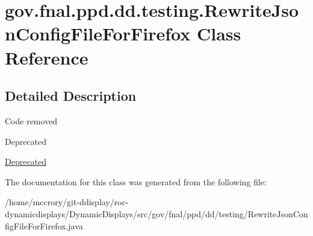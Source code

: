 \hypertarget{classgov_1_1fnal_1_1ppd_1_1dd_1_1testing_1_1RewriteJsonConfigFileForFirefox}{\section{gov.\-fnal.\-ppd.\-dd.\-testing.\-Rewrite\-Json\-Config\-File\-For\-Firefox Class Reference}
\label{classgov_1_1fnal_1_1ppd_1_1dd_1_1testing_1_1RewriteJsonConfigFileForFirefox}
}


\subsection{Detailed Description}
Code removed \begin{DoxyRefDesc}{Deprecated}
\item[\hyperlink{deprecated__deprecated000009}{Deprecated}]\end{DoxyRefDesc}


The documentation for this class was generated from the following file\-:\begin{DoxyCompactItemize}
\item 
/home/mccrory/git-\/ddisplay/roc-\/dynamicdisplays/\-Dynamic\-Displays/src/gov/fnal/ppd/dd/testing/Rewrite\-Json\-Config\-File\-For\-Firefox.\-java\end{DoxyCompactItemize}
